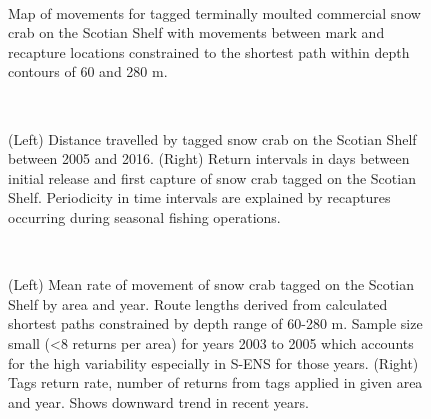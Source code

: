 \documentclass[11pt]{article}
\newcommand{\D}{.}
\newcommand{\h}{\string~}
\newcommand{\es}{bio.data/bio.snowcrab/}
\newcommand{\ei}{bio.data/bio.indicators/}
\begin{document}
%
%
%




\begin{figure}
\centering
{}\
\caption{Map of movements for tagged terminally moulted commercial snow crab on the Scotian Shelf with movements between mark and recapture locations constrained to the shortest path within depth contours of 60 and 280 m.}
\end{figure}
\clearpage


\begin{figure}
\centering
{}\
\caption{(Left) Distance travelled by tagged snow crab on the Scotian Shelf between 2005 and 2016. (Right) Return intervals in days between initial release and first capture of snow crab tagged on the Scotian Shelf. Periodicity in time intervals are explained by recaptures occurring during seasonal fishing operations.}
\end{figure}


\begin{figure}
\centering
{}\
\caption{(Left) Mean rate of movement of snow crab tagged on the Scotian Shelf by area and year. Route lengths derived from calculated shortest paths constrained by depth range of 60-280 m. Sample size small (<8 returns per area) for years 2003 to 2005 which accounts for the high variability especially in S-ENS for those years. (Right) Tags return rate, number of returns from tags applied in given area and year. Shows downward trend in recent years.}
\end{figure}
\clearpage
\end{document}

